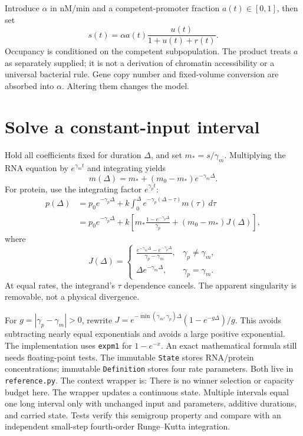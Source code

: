 Introduce $\alpha$ in nM/min and a competent-promoter fraction
$a(t)\in[0,1]$, then set
\begin{equation}
 s(t)=\alpha a(t)\frac{u(t)}{1+u(t)+r(t)}.
\end{equation}
Occupancy is conditioned on the competent subpopulation. The product treats
$a$ as separately supplied; it is not a derivation of chromatin accessibility
or a universal bacterial rule. Gene copy number and fixed-volume conversion
are absorbed into $\alpha$. Altering them changes the model.

\section{Solve a constant-input interval}
Hold all coefficients fixed for duration $\Delta$, and set $m_*=s/\gamma_m$.
Multiplying the RNA equation by $e^{\gamma_m t}$ and integrating yields
\begin{equation}
 m(\Delta)=m_*+(m_0-m_*)e^{-\gamma_m\Delta}.
\end{equation}
For protein, use the integrating factor $e^{\gamma_p t}$:
\begin{align}
 p(\Delta)&=p_0e^{-\gamma_p\Delta}
  +k\int_0^\Delta e^{-\gamma_p(\Delta-\tau)}m(\tau)\,d\tau\\
 &=p_0e^{-\gamma_p\Delta}
  +k\left[m_*\frac{1-e^{-\gamma_p\Delta}}{\gamma_p}
    +(m_0-m_*)J(\Delta)\right],
\end{align}
where
\begin{equation}
 J(\Delta)=\begin{cases}
 \displaystyle\frac{e^{-\gamma_m\Delta}-e^{-\gamma_p\Delta}}
 {\gamma_p-\gamma_m},&\gamma_p\ne\gamma_m,\\[6pt]
 \Delta e^{-\gamma_m\Delta},&\gamma_p=\gamma_m.
 \end{cases}
\end{equation}
At equal rates, the integrand's $\tau$ dependence cancels. The apparent
singularity is removable, not a physical divergence.

For $g=|\gamma_p-\gamma_m|>0$, rewrite
$J=e^{-\min(\gamma_m,\gamma_p)\Delta}(1-e^{-g\Delta})/g$.
This avoids subtracting nearly equal exponentials and avoids a large
positive exponential. The implementation uses \texttt{expm1} for
$1-e^{-x}$. An exact mathematical formula still needs floating-point tests.
The immutable \texttt{State} stores RNA/protein concentrations; immutable
\texttt{Definition} stores four rate parameters. Both live in
\texttt{reference.py}. The context wrapper is:
There is no winner selection or capacity budget here. The wrapper updates
a continuous state. Multiple intervals equal one long interval only with
unchanged input and parameters, additive durations, and carried state.
Tests verify this semigroup property and compare with an independent
small-step fourth-order Runge--Kutta integration.

